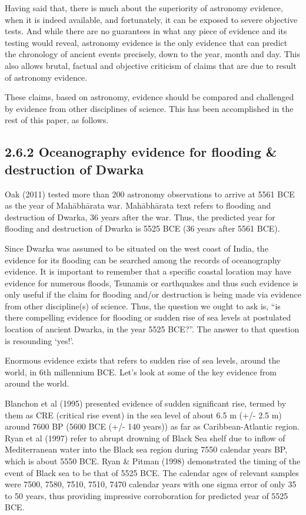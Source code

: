 Having said that, there is much about the superiority of astronomy evidence, when it is indeed available, and fortunately, it can be exposed to severe objective tests. And while there are no guarantees in what any piece of evidence and its testing would reveal, astronomy evidence is the only evidence that can predict the chronology of ancient events precisely, down to the year, month and day. This also allows brutal, factual and objective criticism of claims that are due to result of astronomy evidence.

These claims, based on astronomy, evidence should be compared and challenged by evidence from other disciplines of science. This has been accomplished in the rest of this paper, as follows.

\newpage

\subsection*{2.6.2 Oceanography evidence for flooding \& destruction of Dwarka}

Oak (2011) tested more than 200 astronomy observations to arrive at 5561 BCE as the year of Mahābhārata war. Mahābhārata text refers to flooding and destruction of Dwarka, 36 years after the war. Thus, the predicted year for flooding and destruction of Dwarka is 5525 BCE (36 years after 5561 BCE).

Since Dwarka was assumed to be situated on the west coast of India, the evidence for its flooding can be searched among the records of oceanography evidence. It is important to remember that a specific coastal location may have evidence for numerous floods, Tsunamis or earthquakes and thus such evidence is only useful if the claim for flooding and/or destruction is being made via evidence from other discipline(s) of science. Thus, the question we ought to ask is, “is there compelling evidence for flooding or sudden rise of sea levels at postulated location of ancient Dwarka, in the year 5525 BCE?”. The answer to that question is resounding ‘yes!’.

Enormous evidence exists that refers to sudden rise of sea levels, around the world, in 6th millennium BCE. Let’s look at some of the key evidence from around the world.

Blanchon et al (1995) presented evidence of sudden significant rise, termed by them as CRE (critical rise event) in the sea level of about 6.5 m (+/- 2.5 m) around 7600 BP (5600 BCE (+/- 140 years)) as far as Caribbean-Atlantic region. Ryan et al (1997) refer to abrupt drowning of Black Sea shelf due to inflow of Mediterranean water into the Black sea region during 7550 calendar years BP, which is about 5550 BCE. Ryan \& Pitman (1998) demonstrated the timing of the event of Black sea to be that of 5525 BCE. The calendar ages of relevant samples were 7500, 7580, 7510, 7510, 7470 calendar years with one sigma error of only 35 to 50 years, thus providing impressive corroboration for predicted year of 5525 BCE.

